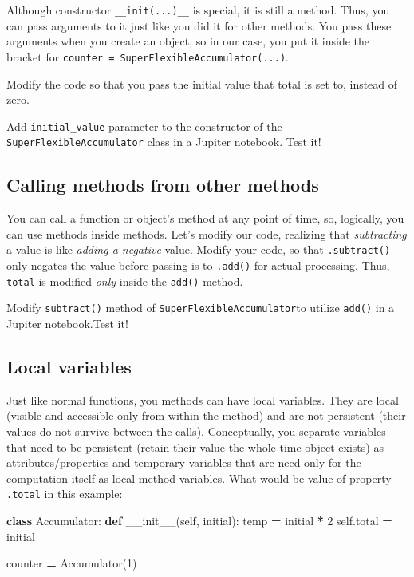 \documentclass[
]{book}
\newenvironment{Shaded}{\begin{snugshade}}{\end{snugshade}}
\newcommand{\DecValTok}[1]{\textcolor[rgb]{0.00,0.00,0.81}{#1}}
\newcommand{\FunctionTok}[1]{\textcolor[rgb]{0.00,0.00,0.00}{#1}}
\newcommand{\KeywordTok}[1]{\textcolor[rgb]{0.13,0.29,0.53}{\textbf{#1}}}
\newcommand{\NormalTok}[1]{#1}
\newcommand{\OperatorTok}[1]{\textcolor[rgb]{0.81,0.36,0.00}{\textbf{#1}}}
\newcommand{\VariableTok}[1]{\textcolor[rgb]{0.00,0.00,0.00}{#1}}
\begin{document}
Although constructor \texttt{\_\_init(...)\_\_} is special, it is still a method. Thus, you can pass arguments to it just like you did it for other methods. You pass these arguments when you create an object, so in our case, you put it inside the bracket for \texttt{counter\ =\ SuperFlexibleAccumulator(...)}.

Modify the code so that you pass the initial value that total is set to, instead of zero.

Add \texttt{initial\_value} parameter to the constructor of the \texttt{SuperFlexibleAccumulator} class in a Jupiter notebook. Test it!

\hypertarget{calling-methods-from-other-methods}{%
\subsection{Calling methods from other methods}\label{calling-methods-from-other-methods}}

You can call a function or object's method at any point of time, so, logically, you can use methods inside methods. Let's modify our code, realizing that \emph{subtracting} a value is like \emph{adding a negative} value. Modify your code, so that \texttt{.subtract()} only negates the value before passing is to \texttt{.add()} for actual processing. Thus, \texttt{total} is modified \emph{only} inside the \texttt{add()} method.

Modify \texttt{subtract()} method of \texttt{SuperFlexibleAccumulator}to utilize \texttt{add()} in a Jupiter notebook.Test it!

\hypertarget{local-variables}{%
\subsection{Local variables}\label{local-variables}}

Just like normal functions, you methods can have local variables. They are local (visible and accessible only from within the method) and are not persistent (their values do not survive between the calls). Conceptually, you separate variables that need to be persistent (retain their value the whole time object exists) as attributes/properties and temporary variables that are need only for the computation itself as local method variables. What would be value of property \texttt{.total} in this example:

\begin{Shaded}
\begin{Highlighting}[]
\KeywordTok{class}\NormalTok{ Accumulator:}
    \KeywordTok{def} \FunctionTok{\_\_init\_\_}\NormalTok{(}\VariableTok{self}\NormalTok{, initial):}
\NormalTok{        temp }\OperatorTok{=}\NormalTok{ initial }\OperatorTok{*} \DecValTok{2}
        \VariableTok{self}\NormalTok{.total }\OperatorTok{=}\NormalTok{ initial}
        
\NormalTok{counter }\OperatorTok{=}\NormalTok{ Accumulator(}\DecValTok{1}\NormalTok{)}
\end{Highlighting}
\end{Shaded}
\end{document}
